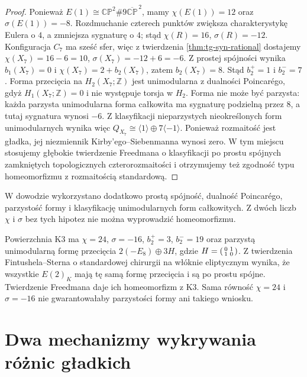 \begin{proof}
Ponieważ $E(1)\cong\mathbb{CP}^2\#9\overline{\mathbb{CP}}^{\,2}$,
mamy $\chi(E(1))=12$ oraz $\sigma(E(1))=-8$.
Rozdmuchanie czterech punktów zwiększa charakterystykę Eulera
o $4$, a zmniejsza sygnaturę o $4$; stąd
$\chi(R)=16$, $\sigma(R)=-12$.
Konfiguracja $C_7$ ma sześć sfer, więc
z twierdzenia \ref{thm:tg-syn-rational} dostajemy
$\chi(X_7)=16-6=10$, $\sigma(X_7)=-12+6=-6$.
Z prostej spójności wynika $b_1(X_7)=0$ i
$\chi(X_7)=2+b_2(X_7)$, zatem $b_2(X_7)=8$.
Stąd $b_2^+=1$ i $b_2^-=7$. Forma przecięcia
na $H_2(X_7;\mathbb Z)$ jest unimodularna
z dualności Poincar\'ego, gdyż $H_1(X_7;\mathbb Z)=0$
i nie występuje torsja w $H_2$.
Forma nie może być parzysta: każda parzysta unimodularna
forma całkowita ma sygnaturę podzielną przez $8$,
a tutaj sygnatura wynosi $-6$. Z klasyfikacji nieparzystych
nieokreślonych form unimodularnych wynika więc
$Q_{X_7}\cong\langle1\rangle\oplus7\langle-1\rangle$.
Ponieważ rozmaitość jest gładka, jej niezmiennik
Kirby'ego--Siebenmanna wynosi zero. W tym miejscu stosujemy
głębokie twierdzenie Freedmana o klasyfikacji po prostu spójnych
zamkniętych topologicznych czterorozmaitości i otrzymujemy
też zgodność typu homeomorfizmu z rozmaitością standardową.
\end{proof}

\begin{uwaga}
W dowodzie wykorzystano dodatkowo prostą spójność, dualność
Poincar\'ego, parzystość formy i klasyfikację unimodularnych
form całkowitych. Z dwóch liczb $\chi$ i $\sigma$ bez tych
hipotez nie można wyprowadzić homeomorfizmu.
\end{uwaga}

\begin{przyklad}
Powierzchnia K3 ma $\chi=24$, $\sigma=-16$,
$b_2^+=3$, $b_2^-=19$ oraz parzystą unimodularną
formę przecięcia $2(-E_8)\oplus3H$, gdzie
$H=\begin{psmallmatrix}0&1\\1&0\end{psmallmatrix}$.
Z twierdzenia Fintushela--Sterna o standardowej chirurgii
na włóknie eliptycznym wynika, że wszystkie $E(2)_K$
mają tę samą formę przecięcia i są po prostu spójne.
Twierdzenie Freedmana daje ich homeomorfizm z K3.
Sama równość $\chi=24$ i $\sigma=-16$ nie gwarantowałaby
parzystości formy ani takiego wniosku.
\end{przyklad}

\section{Dwa mechanizmy wykrywania różnic gładkich}
\label{sec:tg-syn-sw}

